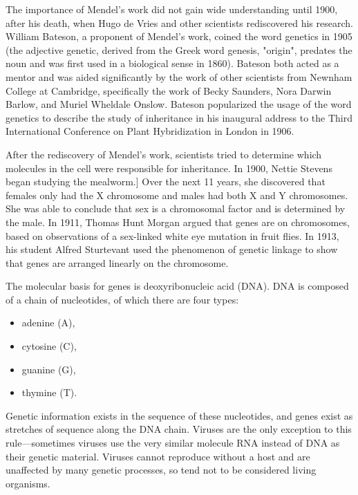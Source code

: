 The importance of Mendel's work did not gain wide understanding until 1900, after his death,
when Hugo de Vries and other scientists rediscovered his research.
William Bateson, a proponent of Mendel's work, coined the word genetics in 1905
(the adjective genetic, derived from the Greek word genesis, "origin", predates the noun and was
first used in a biological sense in 1860).
Bateson both acted as a mentor and was aided significantly by the work of other scientists from
Newnham College at Cambridge, specifically the work of Becky Saunders, Nora Darwin Barlow, and 
Muriel Wheldale Onslow.
Bateson popularized the usage of the word genetics to describe the study of inheritance in his
inaugural address to the Third International Conference on Plant Hybridization in
London in 1906.

After the rediscovery of Mendel's work, scientists tried to determine which molecules in the cell
were responsible for inheritance. 
In 1900, Nettie Stevens began studying the mealworm.] Over the next 11 years, she discovered that
females only had the X chromosome and males had both X and Y chromosomes.
She was able to conclude that sex is a chromosomal factor and is determined by the male.
In 1911, Thomas Hunt Morgan argued that genes are on chromosomes, based on observations of a
sex-linked white eye mutation in fruit flies.
In 1913, his student Alfred Sturtevant used the phenomenon of genetic linkage to show that genes
are arranged linearly on the chromosome.

The molecular basis for genes is deoxyribonucleic acid (DNA).
DNA is composed of a chain of nucleotides, of which there are four types:
\begin{itemize}
	\item adenine (A),
	\item cytosine (C),
	\item guanine (G),
	\item thymine (T).
\end{itemize}
Genetic information exists in the sequence of these nucleotides, and genes exist as stretches of
sequence along the DNA chain.
Viruses are the only exception to this rule—sometimes viruses use the very similar molecule RNA
instead of DNA as their genetic material.
Viruses cannot reproduce without a host and are unaffected by many genetic processes,
so tend not to be considered living organisms.

